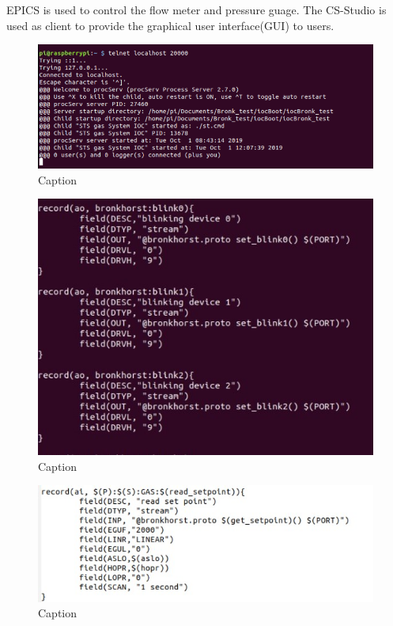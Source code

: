EPICS is used to control the flow meter and pressure guage. The CS-Studio is used as client to provide the graphical user interface(GUI) to users.
\begin{figure}
    \centering
    \includegraphics[width=1\textwidth]{images/procserv.PNG}
    \caption{Caption}
    \label{fig:my_label}
\end{figure}
\begin{figure}
    \centering
    \includegraphics[width=1\textwidth]{images/dbrecord.jpg}
    \caption{Caption}
    \label{fig:my_label}
\end{figure}
\begin{figure}
    \centering
    \includegraphics[width=1\textwidth]{images/subsitution.jpg}
    \caption{Caption}
    \label{fig:my_label}
\end{figure}
